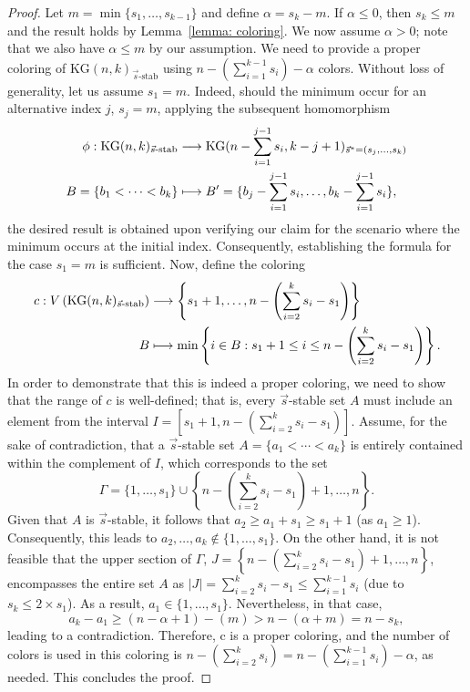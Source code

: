 \documentclass[preprint,12pt,3p]{elsarticle}
\begin{document}
\begin{proof}
  Let $m = \min\{s_1, \ldots, s_{k-1}\}$ and define $\alpha = s_k - m$. If $\alpha \leq 0$, then $s_k \leq m$ and the result holds by Lemma~\ref{lemma: coloring}. We now assume $\alpha > 0$; note that we also have $\alpha \leq m$ by our assumption. We need to provide a proper coloring of $\mathrm{KG}(n, k)_{\vec{s}\text{-stab}}$ using $n - \left(\sum_{i=1}^{k-1} s_i\right) - \alpha$ colors. Without loss of generality, let us assume $s_1 = m$. Indeed, should the minimum occur for an alternative index $j$, $s_j = m$, applying the subsequent homomorphism \begin{align*}
    \phi : \mathrm{KG}(n,k)_{\vec{s}\textup{-stab}} &\longrightarrow \mathrm{KG}(n - \sum_{i=1}^{j-1} s_i, k - j + 1)_{\vec{s}^* = (s_j, \ldots, s_k)} \\
    B = \{b_1 < \cdots < b_k\} &\longmapsto B' = \{b_j - \sum_{i=1}^{j-1} s_i, \ldots, b_k - \sum_{i=1}^{j-1} s_i\},
  \end{align*}the desired result is obtained upon verifying our claim for the scenario where the minimum occurs at the initial index. Consequently, establishing the formula for the case $s_1 = m$ is sufficient. Now, define the coloring
  \begin{align*}
    c : V\left(\mathrm{KG}(n, k)_{\vec{s}\textup{-stab}}\right) &\longrightarrow \left\{s_1 + 1, \ldots, n - \left(\sum_{i=2}^{k} s_i - s_1\right)\right\} \\
    B &\longmapsto \min\left\{ i \in B : s_1 + 1 \leq i \leq n - \left(\sum_{i=2}^{k} s_i - s_1\right) \right\}.
  \end{align*}
 In order to demonstrate that this is indeed a proper coloring, we need to show that the range of $c$ is well-defined; that is, every $\vec{s}$-stable set $A$ must include an element from the interval $I = \left[s_1 + 1, n - \left(\sum_{i=2}^{k} s_i - s_1\right)\right]$. Assume, for the sake of contradiction, that a $\vec{s}$-stable set $A = \{a_1 < \cdots < a_k\}$ is entirely contained within the complement of $I$, which corresponds to the set 
 \[
  \Gamma = \{1, \ldots, s_1\} \cup \left\{n - \left(\sum_{i=2}^{k} s_i - s_1\right) + 1, \ldots, n\right\}.
  \]
Given that $A$ is $\vec{s}$-stable, it follows that $a_2 \geq a_1 + s_1 \geq s_1 + 1$ (as $a_1 \geq 1$). Consequently, this leads to $a_2, \ldots, a_k \notin \{1, \ldots, s_1\}$. On the other hand, it is not feasible that the upper section of $\Gamma$, $J= \left\{n - \left(\sum_{i=2}^{k} s_i - s_1\right) + 1, \ldots, n\right\}$, encompasses the entire set $A$ as $|J|=\sum_{i=2}^{k} s_i - s_1 \leq \sum_{i=1}^{k-1} s_i$ (due to $s_k\leq 2\times s_1$). As a result, $a_1\in \{1, \ldots, s_1\}$. Nevertheless, in that case, $$a_k-a_1\geq (n-\alpha+1)-(m) > n-(\alpha+m)=n-s_k,$$ leading to a contradiction. Therefore, c is a proper coloring, and the number of colors is used in this coloring is $n - \left(\sum_{i=2}^{k} s_i\right) = n - \left(\sum_{i=1}^{k-1} s_i\right) - \alpha$, as needed. This concludes the proof.

\end{proof}
\end{document}

